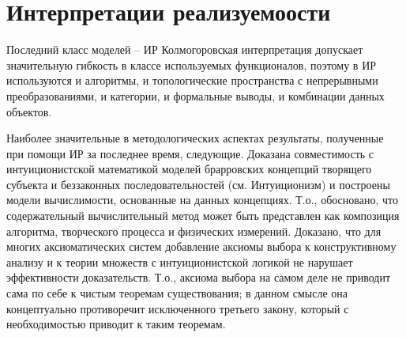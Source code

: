\documentclass[12pt, a4paper]{article}
\begin{document}
\section{Интерпретации реализуемоости}


Последний класс моделей – ИР Колмогоровская интерпретация допускает значительную гибкость в
классе используемых функционалов, поэтому в ИР используются и алгоритмы, и топологические
пространства с непрерывными преобразованиями, и категории, и формальные выводы, и комбинации
данных объектов.

Наиболее значительные в методологических аспектах результаты, полученные при помощи ИР за
последнее время, следующие. Доказана совместимость с интуиционистской математикой моделей
брарровских концепций творящего субъекта и беззаконных последовательностей (см. Интуиционизм)
и построены модели вычислимости, основанные на данных концепциях. Т.о., обосновано, что
содержательный вычислительный метод может быть представлен как композиция алгоритма,
творческого процесса и физических измерений. Доказано, что для многих аксиоматических систем
добавление аксиомы выбора к конструктивному анализу и к теории множеств с интуиционистской
логикой не нарушает эффективности доказательств. Т.о., аксиома выбора на самом деле не приводит
сама по себе к чистым теоремам существования; в данном смысле она концептуально противоречит
исключенного третьего закону, который с необходимостью приводит к таким теоремам.
\end{document}
